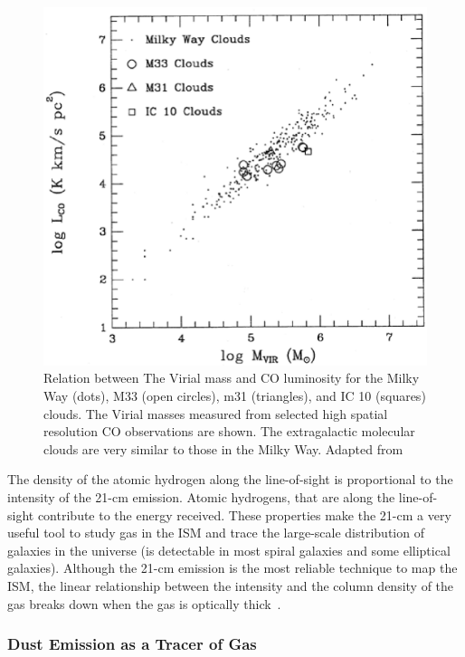 \begin{figure}
\label{fig: mco}
\centering
\includegraphics[width=16cm]{../image_intro/mvirial_lco.eps}
\caption{Relation between The Virial mass and CO luminosity for the Milky Way (dots), M33 (open circles), m31 (triangles), and IC 10 (squares) clouds. The Virial masses measured from selected high spatial resolution CO observations are shown. The extragalactic molecular clouds are very similar to those in the Milky Way. Adapted from~\cite{Young91}}
\end{figure}
 
The density of the atomic hydrogen along the line-of-sight is proportional to the intensity of the 21-cm emission. 
Atomic hydrogens, that are along the line-of-sight contribute to the energy received. 
These properties make the 21-cm a very useful tool to study gas in the ISM and trace the large-scale distribution of galaxies in the universe (\hi is detectable in most spiral galaxies and some elliptical galaxies).
Although the 21-cm emission is the most reliable technique to map the ISM, the linear relationship between the intensity and the column density of the gas breaks down when the gas is optically thick~\citep{Braun09}.

\subsubsection{Dust Emission as a Tracer of Gas}

